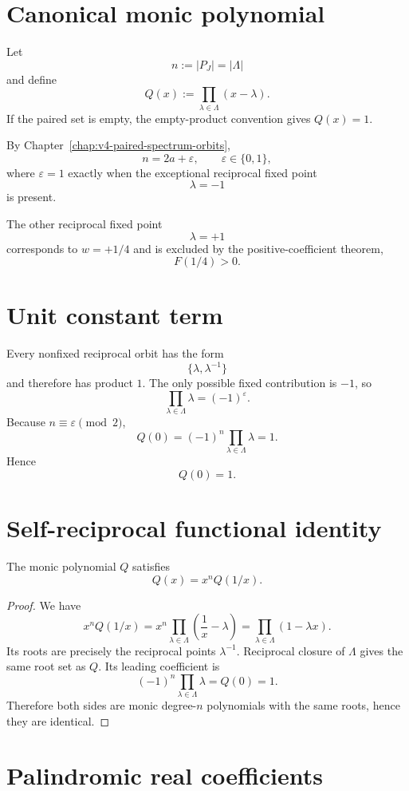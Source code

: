 \section{Canonical monic polynomial}

Let
\[
 n:=|P_J|=|\Lambda|
\]
and define
\[
 Q(x):=\prod_{\lambda\in\Lambda}(x-\lambda).
\]
If the paired set is empty, the empty-product convention gives $Q(x)=1$.

By Chapter~\ref{chap:v4-paired-spectrum-orbits},
\[
 n=2a+\varepsilon,
 \qquad
 \varepsilon\in\{0,1\},
\]
where $\varepsilon=1$ exactly when the exceptional reciprocal fixed point
\[
 \lambda=-1
\]
is present.

The other reciprocal fixed point
\[
 \lambda=+1
\]
corresponds to $w=+1/4$ and is excluded by the positive-coefficient theorem,
\[
 F(1/4)>0.
\]

\section{Unit constant term}

Every nonfixed reciprocal orbit has the form
\[
 \{\lambda,\lambda^{-1}\}
\]
and therefore has product $1$. The only possible fixed contribution is $-1$, so
\[
 \prod_{\lambda\in\Lambda}\lambda=(-1)^\varepsilon.
\]
Because $n\equiv\varepsilon\pmod2$,
\[
 Q(0)
 =(-1)^n\prod_{\lambda\in\Lambda}\lambda
 =1.
\]
Hence
\[
 \boxed{Q(0)=1}.
\]

\section{Self-reciprocal functional identity}

\begin{theorem}
The monic polynomial $Q$ satisfies
\[
 \boxed{Q(x)=x^nQ(1/x)}.
\]
\end{theorem}

\begin{proof}
We have
\[
 x^nQ(1/x)
 =x^n\prod_{\lambda\in\Lambda}\left(\frac1x-\lambda\right)
 =\prod_{\lambda\in\Lambda}(1-\lambda x).
\]
Its roots are precisely the reciprocal points $\lambda^{-1}$. Reciprocal closure of $\Lambda$ gives the same root set as $Q$. Its leading coefficient is
\[
 (-1)^n\prod_{\lambda\in\Lambda}\lambda
 =Q(0)
 =1.
\]
Therefore both sides are monic degree-$n$ polynomials with the same roots, hence they are identical.
\end{proof}

\section{Palindromic real coefficients}

